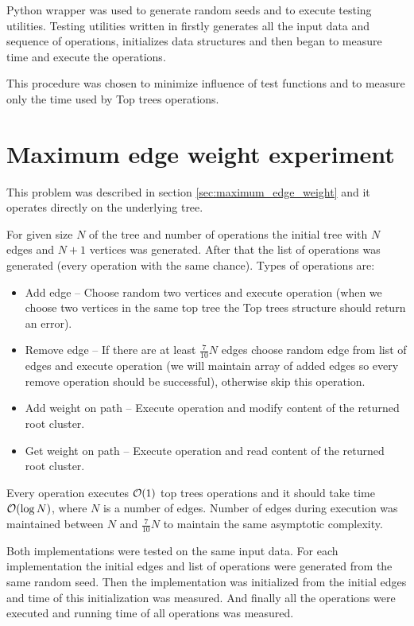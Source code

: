 Python wrapper was used to generate random seeds and to execute testing utilities.
Testing utilities written in \Cpp{} firstly generates all the input data and
sequence of operations, initializes data structures and then began to measure
time and execute the operations.

This procedure was chosen to minimize influence of test functions and to measure
only the time used by Top trees operations.

\vfill\eject %

\section{Maximum edge weight experiment}
\label{sec:experiment_maximum_edge_weight}

This problem was described in section \ref{sec:maximum_edge_weight} and it
operates directly on the underlying tree.

For given size $N$ of the tree and number of operations the initial tree with
$N$ edges and $N+1$ vertices was generated. After that the list of operations
was generated (every operation with the same chance). Types of operations are:

\begin{itemize}
\item Add edge -- Choose random two vertices and execute \Link{} operation
(when we choose two vertices in the same top tree the Top trees structure should
return an error).
\item Remove edge -- If there are at least $\frac{7}{10}N$ edges choose random
edge from list of edges and execute \Cut{} operation (we will maintain array of
added edges so every remove operation should be successful), otherwise skip this
operation.
\item Add weight on path -- Execute \Expose{} operation and modify content of
the returned root cluster.
\item Get weight on path -- Execute \Expose{} operation and read content of the
returned root cluster.
\end{itemize}

Every operation executes ${\cal O}(1)$ top trees operations and it should take time
${\cal O}(\log N)$, where $N$ is a number of edges. Number of edges during execution
was maintained between $N$ and $\frac{7}{10}N$ to maintain the same asymptotic
complexity.

Both implementations were tested on the same input data. For each implementation
the initial edges and list of operations were generated from the same random
seed. Then the implementation was initialized from the initial edges and time of
this initialization was measured. And finally all the operations were executed
and running time of all operations was measured.

